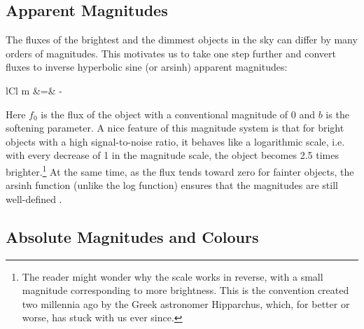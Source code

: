 \subsection{Apparent Magnitudes} 
\label{sub:apparent}

The fluxes of the brightest and the dimmest objects in the sky can differ by many orders of
magnitudes. This motivates us to take one step further and convert fluxes to inverse hyperbolic sine
(or arsinh) apparent magnitudes:
	\begin{IEEEeqnarray*}{lCl}
		m &=& - 
	\end{IEEEeqnarray*}
Here $f_0$ is the flux of the object with a conventional magnitude of 0 and $b$ is the softening
parameter. A nice feature of this magnitude system is that for bright objects with a high
signal-to-noise ratio, it behaves like a logarithmic scale, i.e. with every decrease of 1 in the
magnitude scale, the object becomes 2.5 times brighter.\footnote{ The reader might wonder why the
	scale works in reverse, with a small magnitude corresponding to more brightness. This is the
	convention created two millennia ago by the Greek astronomer Hipparchus, which, for better or worse,
	has stuck with us ever since.} At the same time, as the flux tends toward zero for fainter objects,
the arsinh function (unlike the log function) ensures that the magnitudes are still well-defined
\cite{lupton99}.

\subsection{Absolute Magnitudes and Colours}  
\label{sub:colours}

